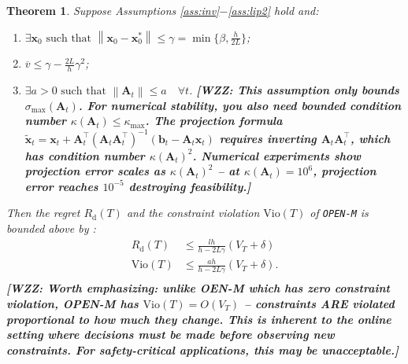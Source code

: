 \documentclass[journal,twoside,web]{ieeecolor}
\newtheorem{theorem}{Theorem}%
\newcommand{\norm}[1]{\left\lVert#1\right\rVert}
\newcommand{\xx}{\mathbf{x}}
\newcommand{\bb}{\mathbf{b}}
\renewcommand{\AA}{\mathbf{A}}
\newcommand{\WZZ}[1]{{\color{red}\bf{[WZZ: #1]}}}
\newcommand{\WZZsuggestion}[1]{{\color{green2}\bf{[WZZ: #1]}}}
\begin{document}
\begin{theorem} Suppose Assumptions \ref{ass:inv}$-$\ref{ass:lip2} hold and:
\begin{enumerate}
    \item $\exists \xx_0 \text{ such that } \norm{\xx_0-\xx_0^*} \le \gamma = \min\{\beta, \frac{h}{2L}\}$;
    \item $\overline{v} \le \gamma - \frac{2L}{h}\gamma^2$;
    \item $\exists a>0\text { such that }\norm{\AA_t}\le a \quad\forall t$.
\WZZ{This assumption only bounds $\sigma_{\max}(\AA_t)$. For numerical stability,
you also need bounded condition number $\kappa(\AA_t) \le \kappa_{\max}$.
The projection formula $\tilde{\xx}_t = \xx_t + \AA_t^\top(\AA_t\AA_t^\top)^{-1}(\bb_t-\AA_t\xx_t)$
requires inverting $\AA_t\AA_t^\top$, which has condition number $\kappa(\AA_t)^2$.
Numerical experiments show projection error scales as $\kappa(\AA_t)^2$ --
at $\kappa(\AA_t) = 10^6$, projection error reaches $10^{-5}$ destroying feasibility.}
\end{enumerate}
Then the regret $R_{\text{d}}(T)$ and the constraint violation $\text{Vio}(T)$ of \texttt{OPEN-M} is bounded above by :
\begin{align}
\label{eq:OPENreg}
    R_{\text{d}} (T) &\le \frac{lh}{h-2L\gamma}(V_T+\delta)\\
    \label{eq:OPENcons}
    \text{Vio}(T)&\le \frac{ah}{h-2L\gamma}(V_T+\delta).\\\nonumber
\end{align}
\WZZsuggestion{Worth emphasizing: unlike OEN-M which has zero constraint violation,
OPEN-M has $\text{Vio}(T) = O(V_T)$ -- constraints ARE violated proportional to how much they change.
This is inherent to the online setting where decisions must be made before observing new constraints.
For safety-critical applications, this may be unacceptable.}
\end{theorem}
\end{document}
